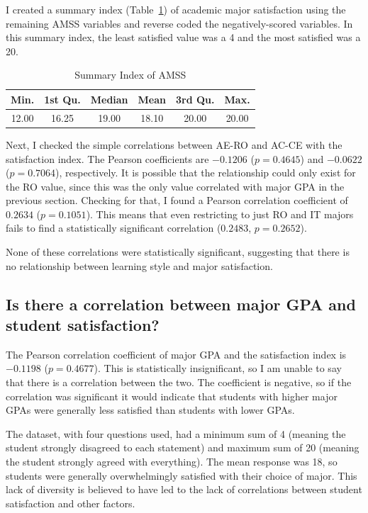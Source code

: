 I created a summary index (Table~\ref{tab:nuata-summary-index}) of academic major satisfaction using the remaining AMSS variables and reverse coded the negatively-scored variables. In this summary index, the least satisfied value was a 4 and the most satisfied was a 20.

\begin{table}[!htb]
  \centering
  \caption{Summary Index of AMSS}
  \label{tab:nuata-summary-index}
  \begin{tabular}{cccccc}
    \toprule
    Min.  & 1st Qu. & Median & Mean  & 3rd Qu. &Max. \\
    \midrule
    12.00 &  16.25  & 19.00  & 18.10 & 20.00   & 20.00 \\
    \bottomrule
  \end{tabular}
\end{table}

Next, I checked the simple correlations between AE-RO and AC-CE with the satisfaction index. The Pearson coefficients are $-0.1206$ ($p=0.4645$) and $-0.0622$ ($p=0.7064$), respectively. It is possible that the relationship could only exist for the RO value, since this was the only value correlated with major GPA in the previous section. Checking for that, I found a Pearson correlation coefficient of $0.2634$ ($p=0.1051$). This means that even restricting to just RO and IT majors fails to find a statistically significant correlation ($0.2483$, $p=0.2652$).

None of these correlations were statistically significant, suggesting that there is no relationship between learning style and major satisfaction.

\subsection{Is there a correlation between major GPA and student satisfaction?}
The Pearson correlation coefficient of major GPA and the satisfaction index is $-0.1198$ ($p=0.4677$). This is statistically insignificant, so I am unable to say that there is a correlation between the two. The coefficient is negative, so if the correlation was significant it would indicate that students with higher major GPAs were generally less satisfied than students with lower GPAs.

The dataset, with four questions used, had a minimum sum of 4 (meaning the student strongly disagreed to each statement) and maximum sum of 20 (meaning the student strongly agreed with everything). The mean response was 18, so students were generally overwhelmingly satisfied with their choice of major. This lack of diversity is believed to have led to the lack of correlations between student satisfaction and other factors.

